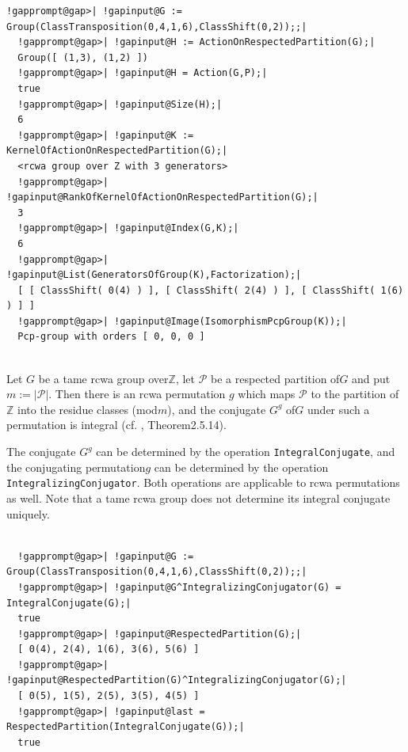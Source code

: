 \documentclass[a4paper,11pt]{report}
\begin{document}
{{{\begin{Verbatim}[commandchars=!@|,fontsize=\small,frame=single,label=Example]
  !gapprompt@gap>| !gapinput@G := Group(ClassTransposition(0,4,1,6),ClassShift(0,2));;|
  !gapprompt@gap>| !gapinput@H := ActionOnRespectedPartition(G);|
  Group([ (1,3), (1,2) ])
  !gapprompt@gap>| !gapinput@H = Action(G,P);|
  true
  !gapprompt@gap>| !gapinput@Size(H);|
  6
  !gapprompt@gap>| !gapinput@K := KernelOfActionOnRespectedPartition(G);|
  <rcwa group over Z with 3 generators>
  !gapprompt@gap>| !gapinput@RankOfKernelOfActionOnRespectedPartition(G);|
  3
  !gapprompt@gap>| !gapinput@Index(G,K);|
  6
  !gapprompt@gap>| !gapinput@List(GeneratorsOfGroup(K),Factorization);|
  [ [ ClassShift( 0(4) ) ], [ ClassShift( 2(4) ) ], [ ClassShift( 1(6) ) ] ]
  !gapprompt@gap>| !gapinput@Image(IsomorphismPcpGroup(K));|
  Pcp-group with orders [ 0, 0, 0 ]
  
\end{Verbatim}
 }

 Let $G$ be a tame rcwa group over{\nobreakspace}{\ensuremath{\mathbb Z}}, let $\mathcal{P}$ be a respected partition of{\nobreakspace}$G$ and put $m := |\mathcal{P}|$. Then there is an rcwa permutation $g$ which maps $\mathcal{P}$ to the partition of{\nobreakspace}{\ensuremath{\mathbb Z}} into the residue
classes (mod{\nobreakspace}$m$), and the conjugate $G^g$ of{\nobreakspace}$G$ under such a permutation is integral (cf. \cite{Kohl05}, Theorem{\nobreakspace}2.5.14). 

     The conjugate $G^g$ can be determined by the operation \texttt{IntegralConjugate}, and the conjugating permutation{\nobreakspace}$g$ can be determined by the operation \texttt{IntegralizingConjugator}. Both operations are applicable to rcwa permutations as well. Note that a
tame rcwa group does not determine its integral conjugate uniquely. 
\begin{Verbatim}[commandchars=!@|,fontsize=\small,frame=single,label=Example]
  
  !gapprompt@gap>| !gapinput@G := Group(ClassTransposition(0,4,1,6),ClassShift(0,2));;|
  !gapprompt@gap>| !gapinput@G^IntegralizingConjugator(G) = IntegralConjugate(G);|
  true
  !gapprompt@gap>| !gapinput@RespectedPartition(G);|
  [ 0(4), 2(4), 1(6), 3(6), 5(6) ]
  !gapprompt@gap>| !gapinput@RespectedPartition(G)^IntegralizingConjugator(G);|
  [ 0(5), 1(5), 2(5), 3(5), 4(5) ]
  !gapprompt@gap>| !gapinput@last = RespectedPartition(IntegralConjugate(G));|
  true
  

\end{Verbatim}}}
\end{document}
